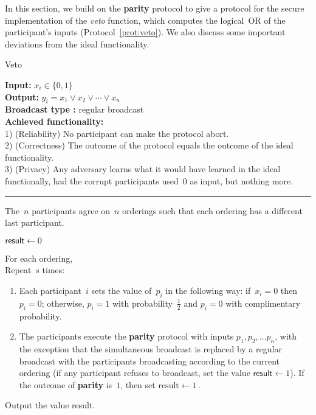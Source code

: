 \documentclass[11pt]{article}
\begin{document}
In this section, we build on the \textbf{parity} protocol to give a
protocol for the secure implementation of the \emph{veto} function,
which computes the logical~OR of the participant's inputs
(Protocol~\ref{prot:veto}). We also discuss some important
deviations from the ideal functionality.
\begin{protocol} \caption{Veto} \label{prot:veto}
{\bf Input:} $x_i\in\{0,1\}$ \\
{\bf Output:} $y_i=x_1 \vee x_2 \vee \cdots  \vee x_n$ \\
{\bf Broadcast type :} regular broadcast\\
{\bf Achieved functionality:} \\
1) (Reliability) No participant can make the protocol abort. \\
2) (Correctness) The outcome of the protocol equals the outcome of the ideal functionality. \\
3) (Privacy) Any adversary learns what it would have learned in the
ideal functionally, had the corrupt participants used~$0$ as input,
but nothing more.

 \vspace{4pt} \hrule \vspace{4pt}

The~$n$ participants agree on~$n$ orderings such that each ordering
has a different last participant.

$\text{\textsf{result}} \leftarrow 0$


For each ordering,\\
\phantom{----}Repeat~$s$ times: \hspace{1cm}\begin{enumerate}
\item \label{step:flip}Each participant~$i$ sets the value of~$p_i$ in the
following way: if~$x_i=0$ then $p_i=0$; otherwise, $p_i=1$ with
probability~$\frac{1}{2}$ and $p_i=0$ with complimentary
probability.
\item \label{veto:step2}The participants execute the
\textbf{parity} protocol with inputs $p_1, p_2, \ldots p_n$, with
the exception that the simultaneous broadcast  is replaced by a
regular broadcast with the participants broadcasting according to
the current ordering (if any participant refuses to broadcast, set
the value $\textsf{result} \leftarrow 1$). If the outcome of
\textbf{parity} is~$1$, then set $\text{result} \leftarrow 1$\,.
\end{enumerate}
Output the value \textsf{result}.
\end{protocol}
\end{document}
